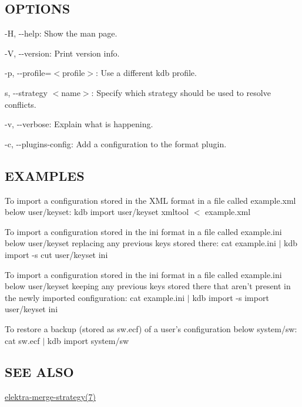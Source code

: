 \subsection*{O\+P\+T\+I\+O\+N\+S}


\begin{DoxyItemize}
\item {\ttfamily -\/\+H}, {\ttfamily -\/-\/help}\+: Show the man page.
\item {\ttfamily -\/\+V}, {\ttfamily -\/-\/version}\+: Print version info.
\item {\ttfamily -\/p}, {\ttfamily -\/-\/profile}=$<$profile$>$\+: Use a different kdb profile.
\item {\ttfamily s}, {\ttfamily -\/-\/strategy $<$name$>$}\+: Specify which strategy should be used to resolve conflicts.
\item {\ttfamily -\/v}, {\ttfamily -\/-\/verbose}\+: Explain what is happening.
\item {\ttfamily -\/c}, {\ttfamily -\/-\/plugins-\/config}\+: Add a configuration to the format plugin.
\end{DoxyItemize}

\subsection*{E\+X\+A\+M\+P\+L\+E\+S}

To import a configuration stored in the X\+M\+L format in a file called {\ttfamily example.\+xml} below {\ttfamily user/keyset}\+: {\ttfamily kdb import user/keyset xmltool $<$ example.\+xml}

To import a configuration stored in the {\ttfamily ini} format in a file called {\ttfamily example.\+ini} below {\ttfamily user/keyset} replacing any previous keys stored there\+: {\ttfamily cat example.\+ini $\vert$ kdb import -\/s cut user/keyset ini}

To import a configuration stored in the {\ttfamily ini} format in a file called {\ttfamily example.\+ini} below {\ttfamily user/keyset} keeping any previous keys stored there that aren't present in the newly imported configuration\+: {\ttfamily cat example.\+ini $\vert$ kdb import -\/s import user/keyset ini}

To restore a backup (stored as {\ttfamily sw.\+ecf}) of a user's configuration below {\ttfamily system/sw}\+: {\ttfamily cat sw.\+ecf $\vert$ kdb import system/sw}

\subsection*{S\+E\+E A\+L\+S\+O}


\begin{DoxyItemize}
\item \hyperlink{md_doc_help_elektra-merge-strategy_doc_help_elektra-merge-strategy_md}{elektra-\/merge-\/strategy(7)} 
\end{DoxyItemize}